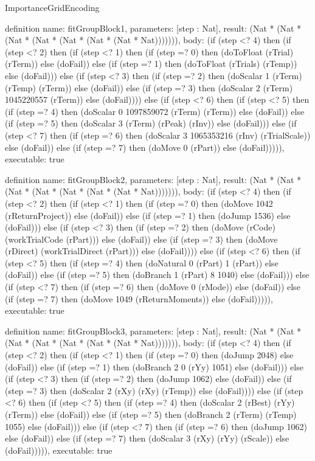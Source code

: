 \begin{lexlean}{ImportanceGridEncoding}
\begin{semanticmodule}
definition{
  name: fitGroupBlock1,
  parameters: [step : Nat],
  result: (Nat * (Nat * (Nat * (Nat * (Nat * (Nat * (Nat * Nat))))))),
  body: (if (step <? 4) then
      (if (step <? 2) then
      (if (step <? 1) then
      (if (step =? 0) then (doToFloat (rTrial) (rTerm)) else (doFail)) else
      (if (step =? 1) then (doToFloat (rTrials) (rTemp)) else (doFail))) else
      (if (step <? 3) then
      (if (step =? 2) then (doScalar 1 (rTerm) (rTemp) (rTerm)) else (doFail)) else
      (if (step =? 3) then (doScalar 2 (rTerm) 1045220557 (rTerm)) else (doFail)))) else
      (if (step <? 6) then
      (if (step <? 5) then
      (if (step =? 4) then (doScalar 0 1097859072 (rTerm) (rTerm)) else (doFail)) else
      (if (step =? 5) then (doScalar 3 (rTerm) (rPeak) (rInv)) else (doFail))) else
      (if (step <? 7) then
      (if (step =? 6) then (doScalar 3 1065353216 (rInv) (rTrialScale)) else (doFail)) else
      (if (step =? 7) then (doMove 0 (rPart)) else (doFail))))),
  executable: true
}

definition{
  name: fitGroupBlock2,
  parameters: [step : Nat],
  result: (Nat * (Nat * (Nat * (Nat * (Nat * (Nat * (Nat * Nat))))))),
  body: (if (step <? 4) then
      (if (step <? 2) then
      (if (step <? 1) then
      (if (step =? 0) then (doMove 1042 (rReturnProject)) else (doFail)) else
      (if (step =? 1) then (doJump 1536) else (doFail))) else
      (if (step <? 3) then
      (if (step =? 2) then (doMove (rCode) (workTrialCode (rPart))) else (doFail)) else
      (if (step =? 3) then (doMove (rDirect) (workTrialDirect (rPart))) else (doFail)))) else
      (if (step <? 6) then
      (if (step <? 5) then
      (if (step =? 4) then (doNatural 0 (rPart) 1 (rPart)) else (doFail)) else
      (if (step =? 5) then (doBranch 1 (rPart) 8 1040) else (doFail))) else
      (if (step <? 7) then
      (if (step =? 6) then (doMove 0 (rMode)) else (doFail)) else
      (if (step =? 7) then (doMove 1049 (rReturnMoments)) else (doFail))))),
  executable: true
}

definition{
  name: fitGroupBlock3,
  parameters: [step : Nat],
  result: (Nat * (Nat * (Nat * (Nat * (Nat * (Nat * (Nat * Nat))))))),
  body: (if (step <? 4) then
      (if (step <? 2) then
      (if (step <? 1) then
      (if (step =? 0) then (doJump 2048) else (doFail)) else
      (if (step =? 1) then (doBranch 2 0 (rYy) 1051) else (doFail))) else
      (if (step <? 3) then
      (if (step =? 2) then (doJump 1062) else (doFail)) else
      (if (step =? 3) then (doScalar 2 (rXy) (rXy) (rTemp)) else (doFail)))) else
      (if (step <? 6) then
      (if (step <? 5) then
      (if (step =? 4) then (doScalar 2 (rBest) (rYy) (rTerm)) else (doFail)) else
      (if (step =? 5) then (doBranch 2 (rTerm) (rTemp) 1055) else (doFail))) else
      (if (step <? 7) then
      (if (step =? 6) then (doJump 1062) else (doFail)) else
      (if (step =? 7) then (doScalar 3 (rXy) (rYy) (rScale)) else (doFail))))),
  executable: true
}


\end{semanticmodule}
\end{lexlean}
